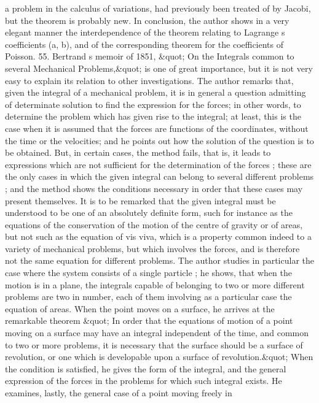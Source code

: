 \documentclass[11pt,a4paper]{book}
\begin{document}
a
problem
in
the
calculus
of
variations,
had
previously been
treated
of by
Jacobi, but
the
theorem
is
probably
new.
In
conclusion,
the
author
shows
in
a
very
elegant
manner
the
interdependence
of
the
theorem
relating
to
Lagrange s
coefficients
(a,
b),
and of the corresponding theorem
for the
coefficients
of Poisson.
55.
Bertrand s
memoir
of
1851,
\&quot; On
the
Integrals common
to
several
Mechanical
Problems,\&quot;
is
one
of
great
importance, but
it
is
not
very
easy
to
explain
its
relation
to
other
investigations.
The
author
remarks
that,
given
the
integral
of
a
mechanical
problem,
it
is
in
general
a
question
admitting
of
determinate
solution
to
find
the
expression
for
the
forces;
in
other
words,
to
determine
the
problem
which
has
given
rise
to
the
integral;
at
least,
this
is
the
case when
it
is
assumed
that
the
forces
are
functions
of
the
coordinates, without
the
time
or
the
velocities;
and he points
out
how the
solution
of
the
question
is
to
be
obtained.
But,
in
certain
cases,
the method
fails,
that
is,
it
leads
to
expressions
which
are
not
sufficient
for
the
determination
of
the
forces
;
these
are
the
only
cases
in
which
the
given
integral
can
belong
to
several
different problems
;
and
the method shows the
conditions
necessary
in
order
that
these
cases may present
themselves.
It
is
to be remarked that
the given integral must
be
understood
to
be
one
of
an
absolutely
definite
form,
such
for
instance
as
the
equations
of
the
conservation
of
the
motion
of
the
centre
of
gravity
or
of
areas, but
not
such
as
the
equation
of
vis
viva,
which
is a
property common
indeed
to a variety
of
mechanical
problems,
but
which
involves
the
forces,
and
is
therefore
not
the
same
equation
for
different
problems.
The
author
studies
in
particular
the
case
where
the
system
consists
of a
single
particle
;
he
shows,
that
when
the
motion
is
in
a
plane,
the
integrals
capable
of
belonging
to
two
or
more
different
problems
are
two
in
number,
each
of
them
involving
as
a
particular
case
the
equation
of
areas.
When
the
point
moves
on
a
surface,
he
arrives
at
the
remarkable
theorem
\&quot; In
order that
the
equations
of
motion
of
a
point
moving
on
a
surface
may
have
an
integral
independent
of
the
time, and common
to
two
or
more
problems,
it
is
necessary
that
the
surface
should
be
a
surface
of
revolution,
or
one
which
is
developable
upon
a
surface
of
revolution.\&quot;
When
the
condition
is
satisfied,
he
gives
the
form
of
the
integral,
and
the
general
expression
of
the
forces
in
the
problems
for
which
such
integral
exists.
He
examines,
lastly,
the
general
case
of
a
point
moving
freely
in
\end{document}
